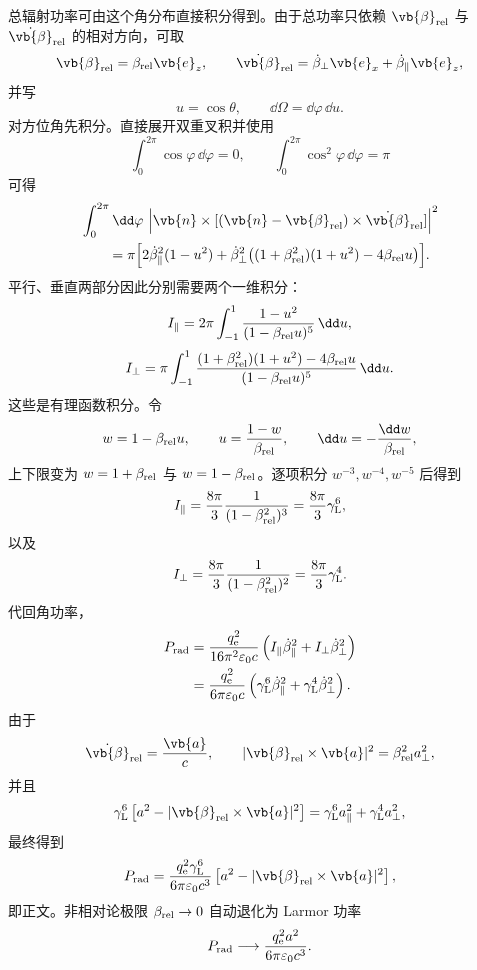 \begin{derivation}[远区角通量积分与总辐射功率]
总辐射功率可由这个角分布直接积分得到。由于总功率只依赖 \(\vb{\beta}_{\rm rel}\) 与 \(\dot{\vb{\beta}}_{\rm rel}\) 的相对方向，可取
\[
\vb{\beta}_{\rm rel}
=
\beta_{\rm rel}\vb{e}_z,
\qquad
\dot{\vb{\beta}}_{\rm rel}
=
\dot\beta_\perp\vb{e}_x
+
\dot\beta_\parallel\vb{e}_z,
\]
并写
\[
u=\cos\theta,
\qquad
\dd\Omega=\dd\varphi\,\dd u.
\]
对方位角先积分。直接展开双重叉积并使用
\[
\int_0^{2\pi}\cos\varphi\,\dd\varphi=0,
\qquad
\int_0^{2\pi}\cos^2\varphi\,\dd\varphi=\pi
\]
可得
\begin{align*}
&\int_0^{2\pi}\dd\varphi\,
\left|
\vb{n}\times[
(\vb{n}-\vb{\beta}_{\rm rel})
\times\dot{\vb{\beta}}_{\rm rel}]
\right|^2\\
&\qquad=
\pi\Bigl[
2\dot\beta_\parallel^2(1-u^2)
+
\dot\beta_\perp^2
\bigl((1+\beta_{\rm rel}^2)(1+u^2)-4\beta_{\rm rel}u\bigr)
\Bigr].
\end{align*}
平行、垂直两部分因此分别需要两个一维积分：
\[
I_\parallel
=
2\pi
\int_{-1}^{1}
\frac{1-u^2}{(1-\beta_{\rm rel}u)^5}\,\dd u,
\]
\[
I_\perp
=
\pi
\int_{-1}^{1}
\frac{
(1+\beta_{\rm rel}^2)(1+u^2)-4\beta_{\rm rel}u
}
{(1-\beta_{\rm rel}u)^5}\,\dd u.
\]
这些是有理函数积分。令
\[
w=1-\beta_{\rm rel}u,
\qquad
u=\frac{1-w}{\beta_{\rm rel}},
\qquad
\dd u=-\frac{\dd w}{\beta_{\rm rel}},
\]
上下限变为 \(w=1+\beta_{\rm rel}\) 与
\(w=1-\beta_{\rm rel}\)。逐项积分 \(w^{-3},w^{-4},w^{-5}\) 后得到
\[
I_\parallel
=
\frac{8\pi}{3}
\frac1{(1-\beta_{\rm rel}^2)^3}
=
\frac{8\pi}{3}\gamma_{\rm L}^6,
\]
以及
\[
I_\perp
=
\frac{8\pi}{3}
\frac1{(1-\beta_{\rm rel}^2)^2}
=
\frac{8\pi}{3}\gamma_{\rm L}^4.
\]
代回角功率，
\begin{align*}
P_{\rm rad}
&=
\frac{q_{\mathrm e}^2}{16\pi^2\varepsilon_0c}
\left(
I_\parallel\dot\beta_\parallel^2
+
I_\perp\dot\beta_\perp^2
\right)\\
&=
\frac{q_{\mathrm e}^2}{6\pi\varepsilon_0c}
\left(
\gamma_{\rm L}^6\dot\beta_\parallel^2
+
\gamma_{\rm L}^4\dot\beta_\perp^2
\right).
\end{align*}
由于
\[
\dot{\vb{\beta}}_{\rm rel}
=
\frac{\vb{a}}{c},
\qquad
|\vb{\beta}_{\rm rel}\times\vb{a}|^2
=
\beta_{\rm rel}^2a_\perp^2,
\]
并且
\[
\gamma_{\rm L}^6
\left[
a^2-
|\vb{\beta}_{\rm rel}\times\vb{a}|^2
\right]
=
\gamma_{\rm L}^6a_\parallel^2
+
\gamma_{\rm L}^4a_\perp^2,
\]
最终得到
\[
{
P_{\rm rad}
=
\frac{q_{\mathrm e}^2\gamma_{\rm L}^6}
{6\pi\varepsilon_0c^3}
\left[
a^2-
|\vb{\beta}_{\rm rel}\times\vb{a}|^2
\right],
}
\]
即正文。非相对论极限
\(\beta_{\rm rel}\to0\) 自动退化为 Larmor 功率
\[
P_{\rm rad}
\longrightarrow
\frac{q_{\mathrm e}^2a^2}{6\pi\varepsilon_0c^3}.
\]
\end{derivation}

